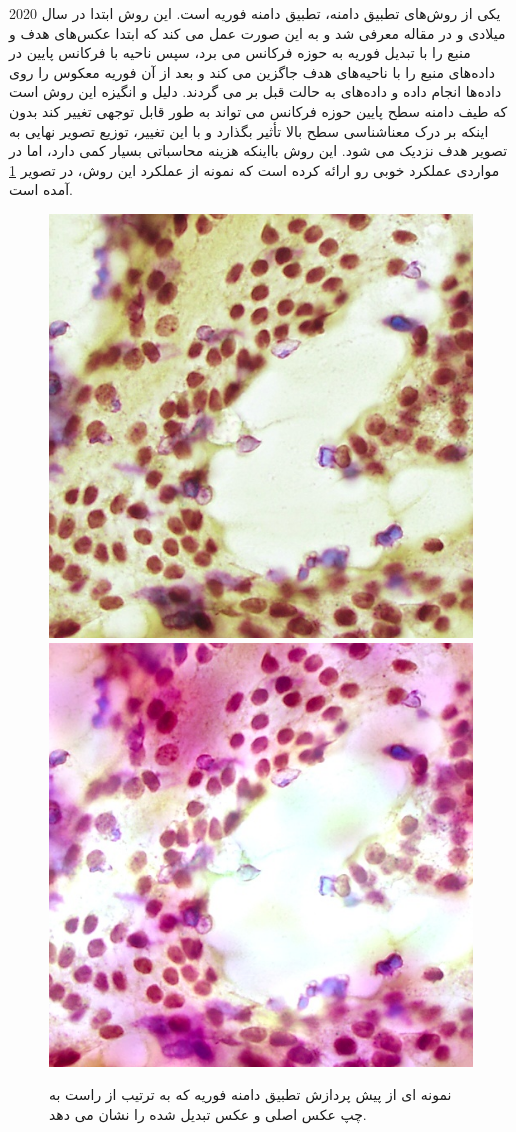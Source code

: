 یکی از روش‌های تطبیق دامنه، تطبیق دامنه فوریه است. این روش ابتدا در سال 2020 میلادی و در مقاله \cite{yang2020fda} معرفی شد و به این صورت عمل می کند که ابتدا عکس‌های هدف و منبع را با تبدیل فوریه به حوزه فرکانس می برد، سپس ناحیه با فرکانس پایین در داده‌های منبع را با ناحیه‌های هدف جاگزین می کند و بعد از آن فوریه معکوس را روی داده‌ها انجام داده و داده‌های به حالت قبل بر می گردند. دلیل و انگیزه این روش است که طیف دامنه سطح پایین حوزه فرکانس می تواند به طور قابل توجهی تغییر کند بدون اینکه بر درک معناشناسی سطح بالا تأثیر بگذارد و با این تغییر، توزیع تصویر نهایی به تصویر هدف نزدیک می شود.
این روش بااینکه هزینه محاسباتی بسیار کمی دارد، اما در مواردی عملکرد خوبی رو ارائه کرده است که نمونه از عملکرد این روش، در تصویر \ref{fda augmentation} آمده است.
\begin{figure}
    \begin{center}
        \includegraphics[width=0.48\linewidth]{figs/suggested_methods/subs/data_augmentation/fda_1054-original.jpeg}
        \includegraphics[width=0.48\linewidth]{figs/suggested_methods/subs/data_augmentation/fda_1054-transformed.jpeg}
    \end{center}
    \caption{نمونه ای از پیش پردازش تطبیق دامنه فوریه که به ترتیب از راست به چپ عکس اصلی و عکس تبدیل شده را نشان می دهد.}
    \label{fda augmentation}
\end{figure}


